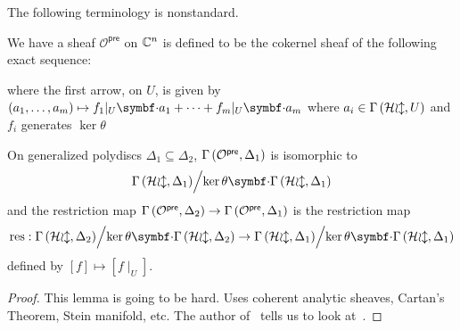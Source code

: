The following terminology is nonstandard.
\begin{definition}\label{def:preanalytification-sheaf}
  We have a sheaf $\mathcal{O}^{\mathsf{pre}}$ on $\mathbb{C}^{n}$ is defined to be the cokernel sheaf of the following exact sequence:
	\begin{center}
	\end{center}
	where the first arrow, on $U$, is given by $(a_{1},\dots,a_{m}) \mapsto f_{1}|_{U}\smul a_{1}+\cdots+f_{m}|_{U}\smul a_{m}$ where $a_{i} \in {\Gamma\left(\ensuremath{\operatorname{\mathcal{Hol}}},U\right)}$ and $f_{i}$ generates $\ker\theta$
\end{definition}

\begin{lemma}
	On generalized polydiscs $\Delta_{1} \subseteq \Delta_{2}$, ${\Gamma\left(\mathcal{O}^{\mathsf{pre}},\Delta_{1}\right)}$ is isomorphic to \[\quotient{\sections{\sheafHol}{\Delta_{1}}}{\ker\theta\smul\sections{\sheafHol}{\Delta_{1}}}\] and the restriction map ${\Gamma\left({\mathcal{O}^{\mathsf{pre}}},\Delta_{2}\right)} \to {\Gamma\left({\mathcal{O}^{\mathsf{pre}}},\Delta_{1}\right)}$ is the restriction map
	\[
		\mathrm{res} :
		\quotient{\sections{\sheafHol}{\Delta_{2}}}{\ker\theta\smul\sections{\sheafHol}{\Delta_{2}}} \to
		\quotient{\sections{\sheafHol}{\Delta_{1}}}{\ker\theta\smul\sections{\sheafHol}{\Delta_{1}}}
	\]
	defined by $[f] \mapsto [f\mid_{U}]$.
\end{lemma}
\begin{proof}
	This lemma is going to be hard. Uses coherent analytic sheaves, Cartan's Theorem, Stein manifold, etc. The author of~\cite[page~108]{neeman2007algebraic} tells us to look at~\cite[page~136, definition 2; page 243, theorem 2]{gunning2022analytic}.
\end{proof}


